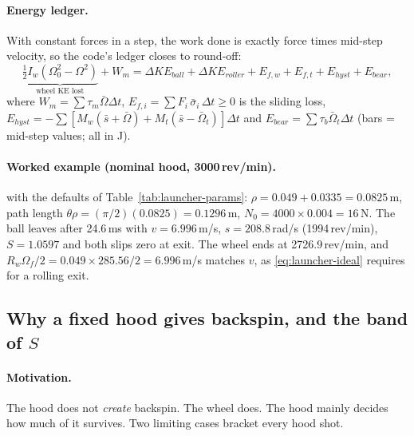 \paragraph{Energy ledger.} With constant forces in a step, the work done is exactly force times mid-step
velocity, so the code's ledger closes to round-off:
\begin{equation}
  \underbrace{\tfrac12 I_w(\Omega_0^2 - \Omega^2)}_{\text{wheel KE lost}} + W_m
  = \Delta KE_{ball} + \Delta KE_{roller} + E_{f,w} + E_{f,t} + E_{hyst} + E_{bear},
  \label{eq:launcher-ledger}
\end{equation}
where $W_m = \sum \tau_m\bar\Omega\Delta t$, $E_{f,i} = \sum F_i\,\bar\sigma_i\,\Delta t \ge 0$ is the sliding
loss, $E_{hyst} = -\sum[M_w(\bar s + \bar\Omega) + M_t(\bar s - \bar\Omega_t)]\Delta t$ and
$E_{bear} = \sum\tau_b\bar\Omega_t\Delta t$ (bars = mid-step values; all in \unit{J}).

\paragraph{Worked example (nominal hood, 3000\,\unit{rev/min}).}  with the
defaults of Table~\ref{tab:launcher-params}:
$\rho = 0.049 + 0.0335 = 0.0825$\,\unit{m}\derived, path length $\theta\rho = (\pi/2)(0.0825) = 0.1296$\,\unit{m}\derived,
$N_0 = 4000\times0.004 = 16$\,\unit{N}\derived. The ball leaves after 24.6\,\unit{ms}\predicted{} with
$v = 6.996$\,\unit{m/s}\predicted, $s = 208.8$\,\unit{rad/s}\predicted{} (1994\,\unit{rev/min}\predicted),
$S = 1.0597$\predicted{} and both slips zero at exit. The wheel ends at
2726.9\,\unit{rev/min}\predicted{}, and $R_w\Omega_f/2 = 0.049\times285.56/2 = 6.996$\,\unit{m/s}\derived{}
matches $v$, as \eqref{eq:launcher-ideal} requires for a rolling exit.

\subsection{Why a fixed hood gives backspin, and the band of $S$}
\label{sec:launcher:Sband}

\paragraph{Motivation.} The hood does not \emph{create} backspin. The wheel does. The hood mainly decides
how much of it survives. Two limiting cases bracket every hood shot.

